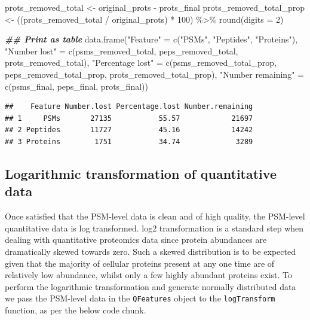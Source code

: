 \documentclass[9pt,a4paper,]{extarticle}
\newenvironment{Shaded}{\begin{snugshade}}{\end{snugshade}}
\newcommand{\AttributeTok}[1]{\textcolor[rgb]{0.77,0.63,0.00}{#1}}
\newcommand{\DecValTok}[1]{\textcolor[rgb]{0.00,0.00,0.81}{#1}}
\newcommand{\DocumentationTok}[1]{\textcolor[rgb]{0.56,0.35,0.01}{\textbf{\textit{#1}}}}
\newcommand{\FunctionTok}[1]{\textcolor[rgb]{0.00,0.00,0.00}{#1}}
\newcommand{\NormalTok}[1]{#1}
\newcommand{\OtherTok}[1]{\textcolor[rgb]{0.56,0.35,0.01}{#1}}
\newcommand{\SpecialCharTok}[1]{\textcolor[rgb]{0.00,0.00,0.00}{#1}}
\newcommand{\StringTok}[1]{\textcolor[rgb]{0.31,0.60,0.02}{#1}}
\begin{document}
\begin{Shaded}
\begin{Highlighting}[]
\NormalTok{prots\_removed\_total }\OtherTok{\textless{}{-}}\NormalTok{ original\_prots }\SpecialCharTok{{-}}\NormalTok{ prots\_final}
\NormalTok{prots\_removed\_total\_prop }\OtherTok{\textless{}{-}}\NormalTok{ ((prots\_removed\_total }\SpecialCharTok{/}\NormalTok{ original\_prots) }\SpecialCharTok{*} \DecValTok{100}\NormalTok{) }\SpecialCharTok{\%\textgreater{}\%}
  \FunctionTok{round}\NormalTok{(}\AttributeTok{digits =} \DecValTok{2}\NormalTok{)}

\DocumentationTok{\#\# Print as table}
\FunctionTok{data.frame}\NormalTok{(}\StringTok{"Feature"} \OtherTok{=} \FunctionTok{c}\NormalTok{(}\StringTok{"PSMs"}\NormalTok{,}
                         \StringTok{"Peptides"}\NormalTok{,}
                         \StringTok{"Proteins"}\NormalTok{),}
           \StringTok{"Number lost"} \OtherTok{=} \FunctionTok{c}\NormalTok{(psms\_removed\_total,}
\NormalTok{                             peps\_removed\_total,}
\NormalTok{                             prots\_removed\_total),}
           \StringTok{"Percentage lost"} \OtherTok{=} \FunctionTok{c}\NormalTok{(psms\_removed\_total\_prop,}
\NormalTok{                                 peps\_removed\_total\_prop,}
\NormalTok{                                 prots\_removed\_total\_prop),}
           \StringTok{"Number remaining"} \OtherTok{=} \FunctionTok{c}\NormalTok{(psms\_final,}
\NormalTok{                                  peps\_final,}
\NormalTok{                                  prots\_final))}
\end{Highlighting}
\end{Shaded}

\begin{verbatim}
##    Feature Number.lost Percentage.lost Number.remaining
## 1     PSMs       27135           55.57            21697
## 2 Peptides       11727           45.16            14242
## 3 Proteins        1751           34.74             3289
\end{verbatim}

\hypertarget{logarithmic-transformation-of-quantitative-data}{%
\subsection{Logarithmic transformation of quantitative data}\label{logarithmic-transformation-of-quantitative-data}}

Once satisfied that the PSM-level data is clean and of high quality, the PSM-level
quantitative data is log transformed. log2 transformation is a standard
step when dealing with quantitative proteomics data since protein abundances are
dramatically skewed towards zero. Such a skewed distribution is to be expected
given that the majority of cellular proteins present at any one time are of
relatively low abundance, whilst only a few highly abundant proteins exist. To
perform the logarithmic transformation and generate normally distributed data we
pass the PSM-level data in the \texttt{QFeatures} object to the \texttt{logTransform}
function, as per the below code chunk.
\end{document}
